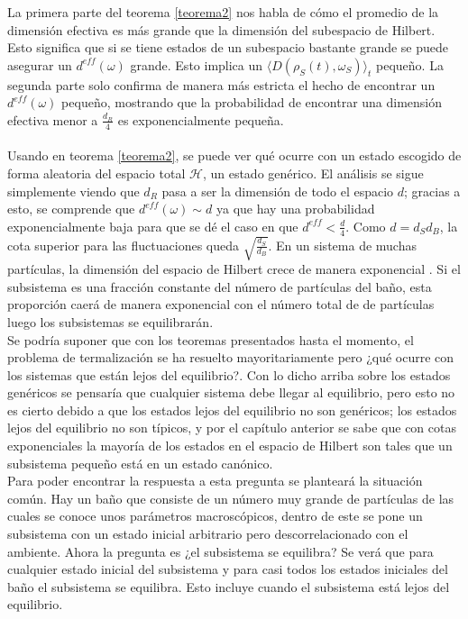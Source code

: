 La primera parte del teorema \ref{teorema2} nos habla de cómo el promedio de la dimensión efectiva es más grande que la dimensión del subespacio de Hilbert. Esto significa que si se tiene estados de un subespacio bastante grande se puede asegurar un $d^{eff}(\omega)$ grande. Esto implica un $\langle D(\rho_{S}(t) ,\omega_{S}) \rangle_{t}$ pequeño. La segunda parte solo confirma de manera más estricta el hecho de encontrar un $d^{eff}(\omega)$ pequeño, mostrando que la probabilidad de encontrar una dimensión efectiva menor a $\frac{d_{R}}{4}$ es exponencialmente pequeña.\\
\\
Usando en teorema \ref{teorema2}, se puede ver qué ocurre con un estado escogido de forma aleatoria del espacio total $\mathcal{H}$, un estado genérico. El análisis se sigue simplemente viendo que $d_{R}$ pasa a ser la dimensión de todo el espacio $d$; gracias a esto, se comprende que $d^{eff}(\omega) \sim d$ ya que  hay una probabilidad exponencialmente baja para que se dé  el caso en que $d^{eff} < \frac{d}{4}$. Como $d=d_{S}d_{B}$, la cota superior para las fluctuaciones queda $\sqrt{\frac{d_{S}}{d_{B}}}$. En un sistema de muchas partículas, la dimensión del espacio de Hilbert crece de manera exponencial \cite{TodaStat}. Si el subsistema es una fracción constante del número de partículas del baño, esta proporción caerá de manera exponencial con el número total de de partículas luego los subsistemas se equilibrarán.
\\
Se podría suponer que  con los teoremas presentados hasta el momento, el problema de termalización se ha resuelto mayoritariamente pero ¿qué ocurre con los sistemas que están lejos del equilibrio?. Con lo dicho arriba sobre los estados genéricos se pensaría que cualquier sistema debe llegar al equilibrio, pero esto no es cierto debido a que los estados lejos del equilibrio no son genéricos; los estados lejos del equilibrio no son típicos, y por el capítulo anterior se sabe que con cotas exponenciales la mayoría de los estados en el espacio de Hilbert son tales que un subsistema pequeño está en un estado canónico.
\\
Para poder encontrar la respuesta a esta pregunta se planteará la situación común. Hay un baño que consiste de un número muy grande de partículas de las cuales se conoce unos parámetros macroscópicos, dentro de este se pone un subsistema con un estado inicial arbitrario pero descorrelacionado con el ambiente. Ahora la pregunta es ¿el subsistema se equilibra? Se verá que para cualquier estado inicial del subsistema y para casi todos los estados iniciales del baño el subsistema se equilibra. Esto incluye cuando el subsistema está lejos del equilibrio.
